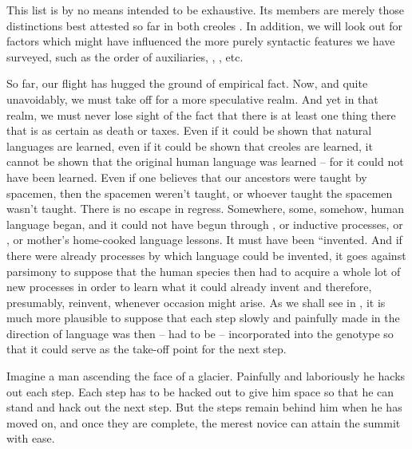 This list is by no means intended to be exhaustive. Its members are merely those distinctions best attested so far in both creoles . In addition, we will look out for factors which might have influenced the more purely syntactic features we have surveyed, such as the order of auxiliaries,  , , etc.

So far, our flight has hugged the ground of empirical fact. Now,
and quite unavoidably, we must take off for a more speculative realm. And yet in that realm, we must never lose sight of the fact that there is at least one thing there that is as certain as death or taxes. Even if it could be shown that natural languages are learned, even if it could be shown that creoles are learned, it cannot be shown that the original human language was learned -- for it could not have been learned. Even if one believes that our ancestors were taught by spacemen, then the spacemen weren't taught, or whoever taught the spacemen wasn't taught. There is no escape in regress. Somewhere, some, somehow, human language began, and it could not have begun through , or inductive processes, or , or mother's home-cooked language lessons. It must have been ``invented. And if there were already processes by which language could be invented, it goes against parsimony to suppose that the human species then had to acquire a whole lot of new processes in order to learn what it could already invent and therefore, presumably, reinvent, whenever occasion might arise. As we shall see in , it is much more plausible to suppose that each step slowly and painfully made in the direction of language was then -- had to be -- incorporated into the genotype so that it could serve as the take-off point for the next step.

Imagine a man ascending the face of a glacier. Painfully and laboriously he hacks out each step. Each step has to be hacked out to give him space so that he can stand and hack out the next step. But the steps remain behind him when he has moved on, and once they are complete, the merest novice can attain the summit with ease.